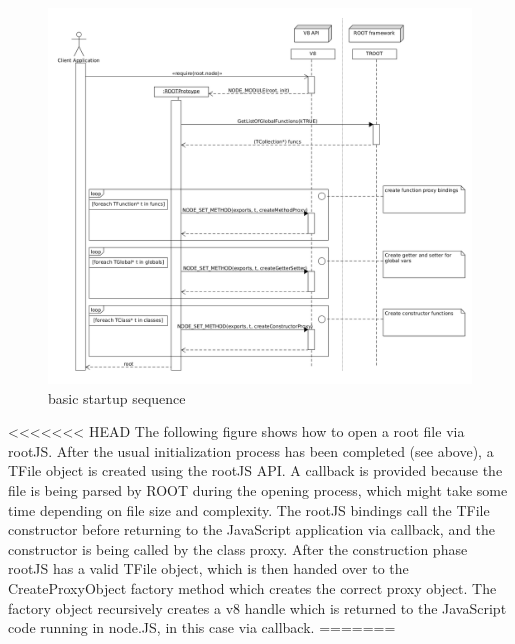 \begin{figure}[htb]
	\centering
	\includegraphics[width=18cm]{./latex/resources/startupSequence.png}
	\caption{basic startup sequence}
\end{figure}
\pagebreak
<<<<<<< HEAD
The following figure shows how to open a root file via rootJS. After the usual initialization process has been completed (see above), a TFile object is created using the rootJS API. A callback is provided because the file is being parsed by ROOT during the opening process, which might take some time depending on file size and complexity. The rootJS bindings call the TFile constructor before returning to the JavaScript application via callback, and the constructor is being called by the class proxy. After the construction phase rootJS has a valid TFile object, which is then handed over to the CreateProxyObject factory method which creates the correct proxy object. The factory object recursively creates a v8 handle which is returned to the JavaScript code running in node.JS, in this case via callback.
=======
